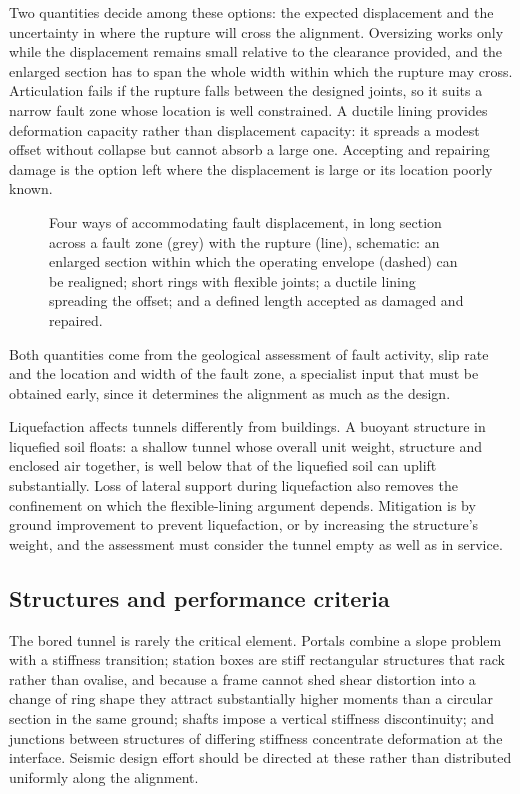 Two quantities decide among these options: the expected displacement and the
uncertainty in where the rupture will cross the alignment. Oversizing works
only while the displacement remains small relative to the clearance
provided, and the enlarged section has to span the whole width within which
the rupture may cross. Articulation fails if the rupture falls between the
designed joints, so it suits a narrow fault zone whose location is well
constrained. A ductile lining provides deformation capacity rather than
displacement capacity: it spreads a modest offset without collapse but cannot
absorb a large one. Accepting and repairing damage is the option left where
the displacement is large or its location poorly known.

\begin{figure}[htbp]
\centering
{}
\caption{Four ways of accommodating fault displacement, in long section across a fault zone (grey) with the rupture (line), schematic: an enlarged section within which the operating envelope (dashed) can be realigned; short rings with flexible joints; a ductile lining spreading the offset; and a defined length accepted as damaged and repaired.}
\label{fig:fault-crossing}
\end{figure}

Both quantities come from the geological assessment of fault activity, slip
rate and the location and width of the fault zone, a specialist input that must be obtained early,
since it determines the alignment as much as the design.

Liquefaction affects tunnels differently from buildings. A buoyant structure
in liquefied soil floats: a shallow tunnel whose overall unit weight, structure
and enclosed air together, is well below that of the liquefied soil can uplift
substantially. Loss of lateral support during
liquefaction also removes the confinement on which the flexible-lining
argument depends. Mitigation is by ground improvement to prevent liquefaction,
or by increasing the structure's weight, and the assessment must consider the
tunnel empty as well as in service.

\subsection{Structures and performance criteria}
\label{sec:seismic-structures-criteria}

The bored tunnel is rarely the critical element. Portals combine a slope
problem with a stiffness transition; station boxes are stiff rectangular
structures that rack rather than ovalise, and because a frame cannot shed
shear distortion into a change of ring shape they attract substantially
higher moments than a circular section in the same ground; shafts impose a vertical stiffness discontinuity; and
junctions between structures of differing stiffness concentrate deformation at
the interface. Seismic design effort should be directed at these rather than
distributed uniformly along the alignment.

